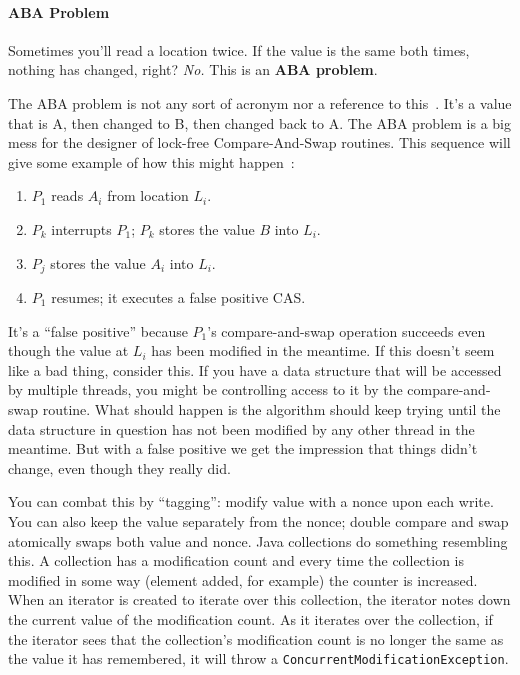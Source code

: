 \documentclass[a4paper]{report}
\begin{document}
\paragraph{ABA Problem}
Sometimes you'll read a location twice. If the value is the same both times, nothing has changed, right? \emph{No.} This is an {\bf ABA problem}.

The ABA problem is not any sort of acronym nor a reference to this~\cite{abba}. It's a value that is A, then changed to B, then changed back to A. The ABA problem is a big mess for the designer of lock-free Compare-And-Swap routines. This sequence will give some example of how this might happen~\cite{abaproblem}:

\begin{enumerate}
	\item $P_{1}$ reads $A_{i}$ from location $L_{i}$.
	\item $P_{k}$ interrupts $P_{1}$; $P_{k}$ stores the value $B$ into $L_{i}$.
	\item $P_{j}$ stores the value $A_{i}$ into $L_{i}$.
	\item $P_{1}$ resumes; it executes a false positive CAS.
\end{enumerate} 

It's a ``false positive'' because $P_{1}$'s compare-and-swap operation succeeds even though the value at $L_{i}$ has been modified in the meantime. If this doesn't seem like a bad thing, consider this. If you have a data structure that will be accessed by multiple threads, you might be controlling access to it by the compare-and-swap routine. What should happen is the algorithm should keep trying until the data structure in question has not been modified by any other thread in the meantime. But with a false positive we get the impression that things didn't change, even though they really did.

You can combat this by ``tagging'': modify value with a nonce upon each
write.  You can also keep the value separately from the nonce; double
compare and swap atomically swaps both value and nonce. Java collections do something resembling this. A collection has a modification count and every time the collection is modified in some way (element added, for example) the counter is increased. When an iterator is created to iterate over this collection, the iterator notes down the current value of the modification count. As it iterates over the collection, if the iterator sees that the collection's modification count is no longer the same as the value it has remembered, it will throw a \texttt{ConcurrentModificationException}. 
\end{document}
